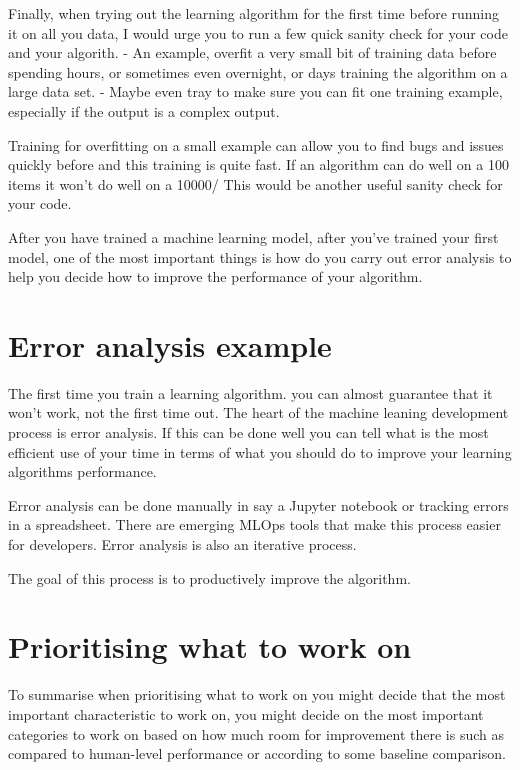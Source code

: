 Finally, when trying out the learning algorithm for the first time before running it on all you data, I would urge you to run a few quick sanity check for your code and your algorith.
- An example, overfit a very small bit of training data before spending hours, or sometimes even overnight, or days training the algorithm on a large data set.
- Maybe even tray to make sure you can fit one training example, especially if the output is a complex output.

Training for overfitting on a small example can allow you to find bugs and issues quickly before and this training is quite fast.
If an algorithm can do well on a 100 items it won't do well on a 10000/
This would be another useful sanity check for your code.

After you have trained a machine learning model, after you've trained your first model, one of the most important things is how do you carry out error analysis to help you decide how to improve the performance of your algorithm.

\section{Error analysis example}

The first time you train a learning algorithm.
you can almost guarantee that it won't work, not the first time out.
The heart of the machine leaning development process is error analysis.
If this can be done well you can tell what is the most efficient use of your time in terms of what you should do to improve your learning algorithms performance.


Error analysis can be done manually in say a Jupyter notebook or tracking errors in a spreadsheet.
There are emerging MLOps tools that make this process easier for developers.
Error analysis is also an iterative process.

The goal of this process is to productively improve the algorithm.

\section{Prioritising what to work on}

To summarise when prioritising what to work on you might decide that the most important characteristic to work on, you might decide on the most important categories to work on based on how much room for improvement there is such as compared to human-level performance or according to some baseline comparison.

